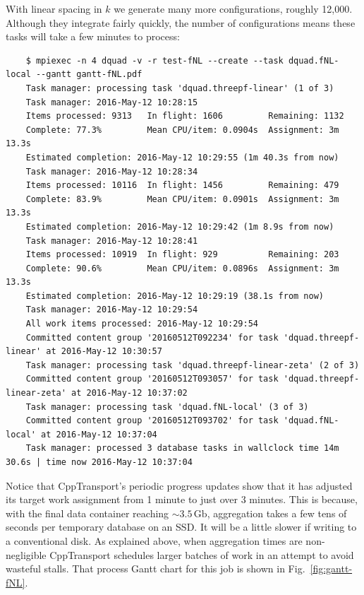 \documentclass[11pt,a4paper]{article}
\newcommand{\packagefont}{\sffamily}
\newcommand{\CppTransport}{{\packagefont CppTransport}}
\newcommand{\Gb}{\,\mathrm{Gb}}
\begin{document}
With linear spacing in $k$ we generate many more configurations,
roughly 12,000.
Although they integrate fairly quickly, the
number of configurations means these tasks will take a few minutes to process:
\begin{verbatim}
    $ mpiexec -n 4 dquad -v -r test-fNL --create --task dquad.fNL-local --gantt gantt-fNL.pdf
    Task manager: processing task 'dquad.threepf-linear' (1 of 3)
    Task manager: 2016-May-12 10:28:15
    Items processed: 9313   In flight: 1606         Remaining: 1132         
    Complete: 77.3%         Mean CPU/item: 0.0904s  Assignment: 3m 13.3s    
    Estimated completion: 2016-May-12 10:29:55 (1m 40.3s from now)                  
    Task manager: 2016-May-12 10:28:34
    Items processed: 10116  In flight: 1456         Remaining: 479          
    Complete: 83.9%         Mean CPU/item: 0.0901s  Assignment: 3m 13.3s    
    Estimated completion: 2016-May-12 10:29:42 (1m 8.9s from now)                   
    Task manager: 2016-May-12 10:28:41
    Items processed: 10919  In flight: 929          Remaining: 203          
    Complete: 90.6%         Mean CPU/item: 0.0896s  Assignment: 3m 13.3s    
    Estimated completion: 2016-May-12 10:29:19 (38.1s from now)                     
    Task manager: 2016-May-12 10:29:54
    All work items processed: 2016-May-12 10:29:54                                  
    Committed content group '20160512T092234' for task 'dquad.threepf-linear' at 2016-May-12 10:30:57
    Task manager: processing task 'dquad.threepf-linear-zeta' (2 of 3)
    Committed content group '20160512T093057' for task 'dquad.threepf-linear-zeta' at 2016-May-12 10:37:02
    Task manager: processing task 'dquad.fNL-local' (3 of 3)
    Committed content group '20160512T093702' for task 'dquad.fNL-local' at 2016-May-12 10:37:04
    Task manager: processed 3 database tasks in wallclock time 14m 30.6s | time now 2016-May-12 10:37:04
\end{verbatim}
Notice that {\CppTransport}'s
periodic progress updates
show that it has adjusted its target work assignment from 1 minute
to just over 3 minutes.
This is because, with the final data container reaching $\sim 3.5 \Gb$, aggregation
takes a few tens of seconds per temporary database on an SSD.
It will be a little slower if writing to a conventional disk.
As explained above,
when aggregation times are non-negligible
{\CppTransport} schedules larger batches of work in an attempt
to avoid wasteful stalls.
That process Gantt chart for this job is shown
in Fig.~\ref{fig:gantt-fNL}.
\end{document}
